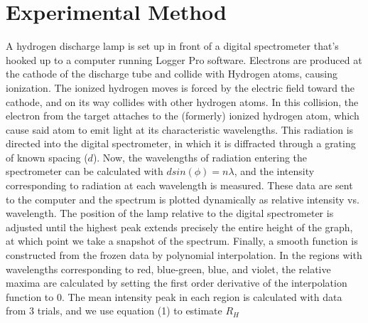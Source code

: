 \documentclass[aps,prl,preprint,groupedaddress]{revtex4-2}
\begin{document}
\section{Experimental Method}
A hydrogen discharge lamp is set up in front of a digital spectrometer that's hooked up to a computer running Logger Pro software. Electrons are produced at the cathode of the discharge tube and collide with Hydrogen atoms, causing ionization. The ionized hydrogen moves is forced by the electric field toward the cathode, and on its way collides with other hydrogen atoms. In this collision, the electron from the target attaches to the (formerly) ionized hydrogen atom, which cause said atom to emit light at its characteristic wavelengths. This radiation is directed into the digital spectrometer, in which it is diffracted through a grating of known spacing ($d$). Now, the wavelengths of radiation entering the spectrometer can be calculated with $d sin(\phi) = n \lambda$, and the intensity corresponding to radiation at each wavelength is measured. These data are sent to the computer and the spectrum is plotted dynamically as relative intensity vs. wavelength. The position of the lamp relative to the digital spectrometer is adjusted until the highest peak extends precisely the entire height of the graph, at which point we take a snapshot of the spectrum. Finally, a smooth function is constructed from the frozen data by polynomial interpolation. In the regions with wavelengths corresponding to red, blue-green, blue, and violet, the relative maxima are calculated by setting the first order derivative of the interpolation function to 0. The mean intensity peak in each region is calculated with data from 3 trials, and we use equation (1) to estimate $R_H$
\end{document}
